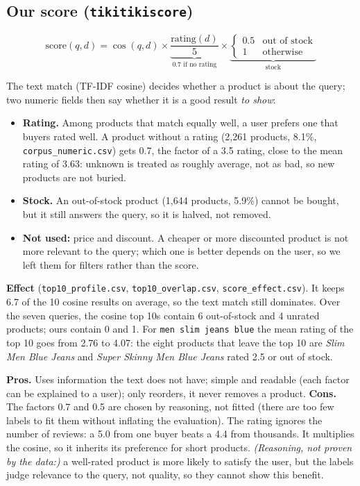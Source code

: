 \documentclass[10pt,a4paper]{article}
\newcommand{\file}[1]{\texttt{\small #1}}
\newcommand{\reasoning}[1]{\textit{(Reasoning, not proven by the data:)} #1}
\begin{document}
\subsection{Our score (\file{tikitikiscore})}

\[
\mathrm{score}(q,d)=\cos(q,d)\times\underbrace{\frac{\mathrm{rating}(d)}{5}}_{0.7\text{ if no rating}}
\times\underbrace{\begin{cases}0.5 & \text{out of stock}\\ 1 & \text{otherwise}\end{cases}}_{\text{stock}}
\]

The text match (TF-IDF cosine) decides whether a product is about the query; two numeric fields then say
whether it is a good result \emph{to show}:
\begin{itemize}
\item \textbf{Rating.} Among products that match equally well, a user prefers one that buyers rated well.
  A product without a rating (2,261 products, 8.1\%, \file{corpus\_numeric.csv}) gets 0.7, the factor of
  a 3.5 rating, close to the mean rating of 3.63: unknown is treated as roughly average, not as bad, so
  new products are not buried.
\item \textbf{Stock.} An out-of-stock product (1,644 products, 5.9\%) cannot be bought, but it still
  answers the query, so it is halved, not removed.
\item \textbf{Not used:} price and discount. A cheaper or more discounted product is not more relevant to
  the query; which one is better depends on the user, so we left them for filters rather than the score.
\end{itemize}

\textbf{Effect} (\file{top10\_profile.csv}, \file{top10\_overlap.csv}, \file{score\_effect.csv}). It keeps 6.7 of the 10 cosine
results on average, so the text match still dominates. Over the seven queries, the cosine top 10s contain
6 out-of-stock and 4 unrated products; ours contain 0 and 1. For \texttt{men slim jeans blue} the mean
rating of the top 10 goes from 2.76 to 4.07: the eight products that leave the top 10 are \emph{Slim Men
Blue Jeans} and \emph{Super Skinny Men Blue Jeans} rated 2.5 or out of stock.

\textbf{Pros.} Uses information the text does not have; simple and readable (each factor can be
explained to a user); only reorders, it never removes a product. \textbf{Cons.} The factors 0.7 and 0.5
are chosen by reasoning, not fitted (there are too few labels to fit them without inflating the
evaluation). The rating ignores the number of reviews: a 5.0 from one buyer beats a 4.4 from thousands.
It multiplies the cosine, so it inherits its preference for short products.
\reasoning{a well-rated product is more likely to satisfy the user, but the labels judge relevance to the
query, not quality, so they cannot show this benefit.}
\end{document}
